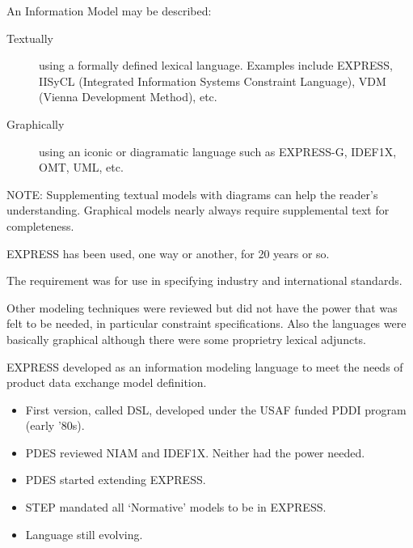 
An Information Model may be described:
\begin{description}
\item[Textually] using a formally defined lexical language. Examples include
EXPRESS, IISyCL (Integrated Information Systems Constraint Language), VDM
(Vienna Development Method), etc.
\item[Graphically] using an iconic or diagramatic language such as EXPRESS-G,
IDEF1X, OMT, UML, etc.
\end{description}

NOTE: Supplementing textual models with diagrams can help the reader's
understanding. Graphical models nearly always require supplemental text for
completeness.


\begin{remarks}
\remintro


   EXPRESS has been used, one way or another, for 20 years
or so.

   The requirement was for use in specifying industry and international
standards.

   Other modeling techniques were reviewed but did not have the power
that was felt to be needed, in particular constraint specifications.
Also the languages were basically graphical although there were some
proprietry lexical adjuncts.



\remend
\end{remarks}


    EXPRESS developed as an information modeling language to meet the needs
of product data exchange model definition.

\begin{itemize}
\item First version, called DSL, developed under the USAF funded PDDI 
      program (early '80s).
\item PDES reviewed NIAM and IDEF1X. Neither had the power needed.
\item PDES started extending EXPRESS.
\item STEP mandated all `Normative' models to be in EXPRESS.
\item Language still evolving.
\end{itemize}

